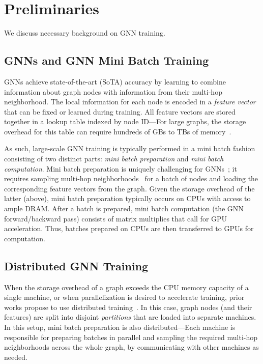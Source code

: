 \section{Preliminaries}
\label{sec:prelim}
We discuss necessary background on GNN training.



\subsection{GNNs and GNN Mini Batch Training}
\label{subsec:prelim_gnns}
GNNs achieve state-of-the-art (SoTA) accuracy by learning to combine information about graph nodes with information from their multi-hop neighborhood. The local information for each node is encoded in a \textit{feature vector} that can be fixed or learned during training. All feature vectors are stored together in a lookup table indexed by node ID---For large graphs, the storage overhead for this table can require hundreds of GBs to TBs of memory~\cite{mariusgnn}.

As such, large-scale GNN training is typically performed in a mini batch fashion consisting of two distinct parts: \textit{mini batch preparation} and \textit{mini batch computation}. Mini batch preparation is uniquely challenging for GNNs~\cite{chami2021machine, dorylus, p3gnn, salient}; it requires sampling multi-hop neighborhoods~\cite{graphsage} for a batch of nodes and loading the corresponding feature vectors from the graph. Given the storage overhead of the latter (above), mini batch preparation typically occurs on CPUs with access to ample DRAM. After a batch is prepared, mini batch computation (the GNN forward/backward pass) consists of matrix multiplies that call for GPU acceleration. Thus, batches prepared on CPUs are then transferred to GPUs for computation.



\subsection{Distributed GNN Training}
\label{subsec:prelim_distributed}
When the storage overhead of a graph exceeds the CPU memory capacity of a single machine, or when parallelization is desired to accelerate training, prior works propose to use distributed training~\cite{shao2024distributed}. In this case, graph nodes (and their features) are split into disjoint \textit{partitions} that are loaded into separate machines. In this setup, mini batch preparation is also distributed---Each machine is responsible for preparing batches in parallel and sampling the required multi-hop neighborhoods across the whole graph, by communicating with other machines as needed.




